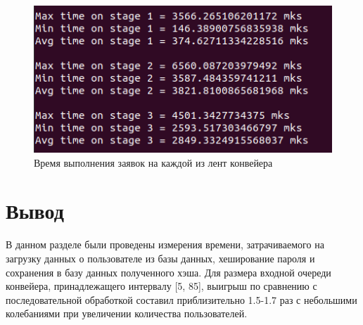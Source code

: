 \documentclass[../report.tex]{subfiles}
\begin{document}
\captionsetup{singlelinecheck=true}
\begin{figure}[H]
	\centering
	\includegraphics[width=0.65\linewidth]{images/maxmintime}
	\caption{Время выполнения заявок на каждой из лент конвейера}
	\label{fig:maxmintime}
\end{figure}


\section*{Вывод}
В данном разделе были проведены измерения времени, затрачиваемого на загрузку данных о пользователе из базы данных, хеширование пароля и сохранения в базу данных полученного хэша.
Для размера входной очереди конвейера, принадлежащего интервалу [5, 85], выигрыш по сравнению с последовательной обработкой составил приблизительно 1.5-1.7 раз с небольшими колебаниями при увеличении количества пользователей.
\newpage
\end{document}
